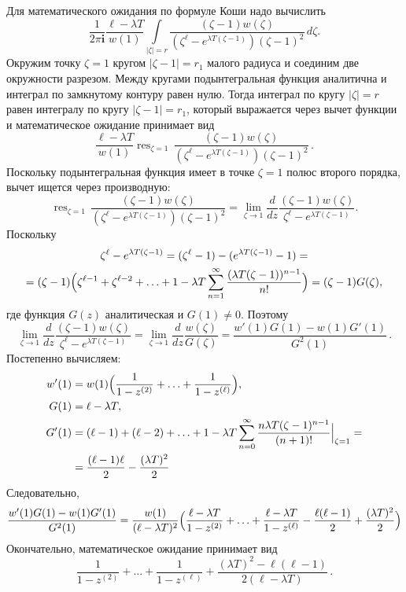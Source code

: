 \documentclass[10pt,oneside,final]{book}
\begin{document}
Для математического ожидания по формуле Коши надо вычислить
\[
\dfrac{1}{2\pi \mathbf i} \dfrac{\ell-\lambda T}{w(1)}
\int\limits_{|\zeta|=r} 
\dfrac{(\zeta-1)w(\zeta)}{(\zeta^\ell-e^{\lambda T(\zeta-1)})(\zeta-1)^2}\,
d\zeta.
\]
Окружим точку $\zeta=1$ кругом $|\zeta-1|=r_1$ малого радиуса и соединим две окружности
разрезом. Между кругами подынтегральная функция аналитична и интеграл по замкнутому контуру равен
нулю. Тогда интеграл по кругу $|\zeta|=r$ равен интегралу по кругу $|\zeta-1|=r_1$, который
выражается через вычет функции и математическое ожидание принимает вид
\[
\dfrac{\ell-\lambda T}{w(1)} \mathop{\mathrm{res}}_{\zeta=1}\,\dfrac{(\zeta-1)w(\zeta)}{(\zeta^\ell-e^{\lambda
       T(\zeta-1)})(\zeta-1)^2}\,. 
\]
Поскольку подынтегральная функция имеет в точке $\zeta=1$ полюс второго порядка, вычет ищется через
производную: 
\[
\mathop{\mathrm{res}}_{\zeta=1}\,\dfrac{(\zeta-1)w(\zeta)}{(\zeta^\ell-e^{\lambda
    T(\zeta-1)})(\zeta-1)^2}=
\lim_{\zeta\to1} \dfrac{d}{dz}\dfrac{(\zeta-1)w(\zeta)}{\zeta^\ell-e^{\lambda
    T(\zeta-1)}}.
\]
Поскольку 
\begin{multline*}
\zeta^\ell-e^{\lambda T(\zeta-1)}=(\zeta^\ell-1)-(e^{\lambda T(\zeta-1)}-1)=
\\ =
(\zeta-1)\Bigl(\zeta^{\ell-1}+\zeta^{\ell-2}+\ldots+1-\lambda T\sum_{n=1}^\infty \dfrac{(\lambda
  T(\zeta-1))^{n-1}}{n!}\Bigr)=(\zeta-1)G(\zeta), 
\end{multline*}
где функция $G(z)$ аналитическая и $G(1)\neq0$. Поэтому
\[
  \lim_{\zeta\to1} \dfrac{d}{dz}\dfrac{(\zeta-1)w(\zeta)}{\zeta^\ell-e^{\lambda
      T(\zeta-1)}}=
    \lim_{\zeta\to1} \dfrac{d}{dz}\dfrac{w(\zeta)}{G(\zeta)}=
    \dfrac{w'(1)G(1)-w(1)G'(1)}{G^2(1)}\,.
\]
Постепенно вычисляем:
\begin{align*}
  w'(1)& =w(1)\Bigl( \dfrac1{1-z^{(2)}} + \ldots+\dfrac1{1-z^{(\ell)}}\Bigr),\\
  G(1) & = \ell-\lambda T,\\
  G'(1) & = (\ell-1)+(\ell-2)+\ldots+1-\lambda T\sum_{n=0}^\infty \dfrac{n\lambda
    T(\zeta-1)^{n-1}}{(n+1)!}\Big|_{\zeta=1}=
  \\ & = \dfrac{(\ell-1)\ell}{2}-\dfrac{(\lambda T)^2}{2}
\end{align*}
Следовательно,
\[
\dfrac{w'(1)G(1)-w(1)G'(1)}{G^2(1)}=\dfrac{w(1)}{(\ell-\lambda T)^2} 
\Bigl(\dfrac{\ell-\lambda T}{1-z^{(2)}} + \ldots+\dfrac{\ell-\lambda
  T}{1-z^{(\ell)}}-\dfrac{\ell(\ell-1)}{2}+
\dfrac{(\lambda T)^2}{2}\Bigr)
\]
Окончательно, математическое ожидание принимает вид
\[
\dfrac{1}{1-z^{(2)}} + \ldots+\dfrac{1}{1-z^{(\ell)}}+\dfrac{(\lambda T)^2-\ell(\ell-1)}{2(\ell-\lambda T)}\,.
\]
\end{document}
